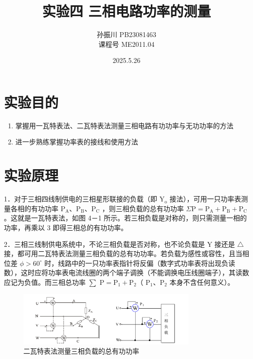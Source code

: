\documentclass{article}
\title{\heiti\zihao{2}实验四 \quad 三相电路功率的测量}
\author{\songti  孙振川  PB23081463 \\
课程号  ME2011.04 }
\date{2025.5.26}
\begin{document}
    \maketitle
\begin{abstract}
    
\end{abstract}
\section{实验目的}
\begin{enumerate}
    \item 掌握用一瓦特表法、二瓦特表法测量三相电路有功功率与无功功率的方法
    \item 进一步熟练掌握功率表的接线和使用方法
\end{enumerate}

\section{实验原理}
1．对于三相四线制供电的三相星形联接的负载（即 $\mathrm{Y}_{\mathrm{o}}$ 接法），可用一只功率表测量各相的有功功率 $\mathrm{P}_{\mathrm{A}} 、 \mathrm{P}_{\mathrm{B}} 、 \mathrm{P}_{\mathrm{C}}$ ，则三相负载的总有功功率 $\Sigma \mathrm{P}=\mathrm{P}_{\mathrm{A}}+\mathrm{P}_{\mathrm{B}}+\mathrm{P}_{\mathrm{C}}$ 。这就是一瓦特表法，如图 4－1 所示。若三相负载是对称的，则只需测量一相的功率，再乘以 3 即得三相总的有功功率。

2．三相三线制供电系统中，不论三相负载是否对称，也不论负载是 Y 接还是 $\triangle$ 接，都可用二瓦特表法测量三相负载的总有功功率。若负载为感性或容性，且当相位差 $\phi>60^{\circ}$ 时，线路中的一只功率表指针将反偏（数字式功率表将出现负读数），这时应将功率表电流线圈的两个端子调换（不能调换电压线圈端子），其读数应记为负值。而三相总功率 $\sum$ $\mathrm{P}=\mathrm{P}_1+\mathrm{P}_2$（ $\mathrm{P}_1 、 \mathrm{P}_2$ 本身不含任何意义）。
\begin{figure}[H]
    \centering
    \includegraphics[width=0.8\textwidth]{img1.png}
    \caption{二瓦特表法测量三相负载的总有功功率}
\end{figure}
\end{document}

